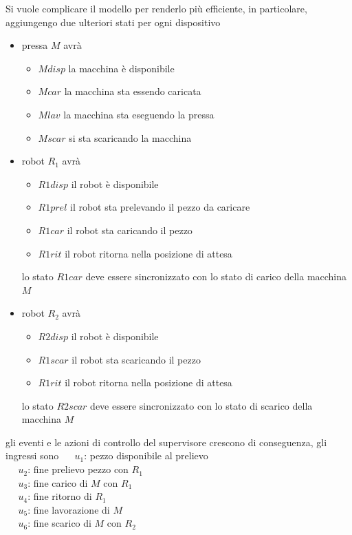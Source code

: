 \documentclass[10pt, letterpaper]{report}
\begin{document}
Si vuole complicare il modello per renderlo più efficiente, in particolare, aggiungengo due ulteriori stati per ogni dispositivo \begin{itemize}
    \item pressa $M$ avrà \begin{itemize}
        \item $Mdisp$ la macchina è disponibile 
        \item $Mcar$ la macchina sta essendo caricata 
        \item $Mlav$ la macchina sta eseguendo la pressa 
        \item $Mscar$ si sta scaricando la macchina 
    \end{itemize}
    \item robot $R_1$ avrà\begin{itemize}
        \item $R1disp$ il robot è disponibile 
        \item $R1prel$ il robot sta prelevando il pezzo da caricare 
        \item $R1car$ il robot sta caricando il pezzo 
        \item $R1rit$ il robot ritorna nella posizione di attesa
    \end{itemize}
    lo stato $R1car$ deve essere sincronizzato con lo stato di carico della macchina $M$
    \item robot $R_2$ avrà\begin{itemize}
        \item $R2disp$ il robot è disponibile 
        \item $R1scar$ il robot sta scaricando il pezzo 
        \item $R1rit$ il robot ritorna nella posizione di attesa
    \end{itemize}
    lo stato $R2scar$ deve essere sincronizzato con lo stato di scarico della macchina $M$
\end{itemize}
gli eventi e le azioni di controllo del supervisore crescono di conseguenza, gli ingressi sono\acc
     $\ \ \ \ \ \ u_1$: pezzo disponibile al prelievo
    \\ $\ \ \ \ \ \ u_2$: fine prelievo pezzo con $R_1$
    \\ $\ \ \ \ \ \ u_3$: fine carico di $M$ con $R_1$
    \\ $\ \ \ \ \ \ u_4$: fine ritorno di $R_1$
    \\ $\ \ \ \ \ \ u_5$: fine lavorazione di $M$
    \\ $\ \ \ \ \ \ u_6$: fine scarico di $M$ con $R_2$
\end{document}
